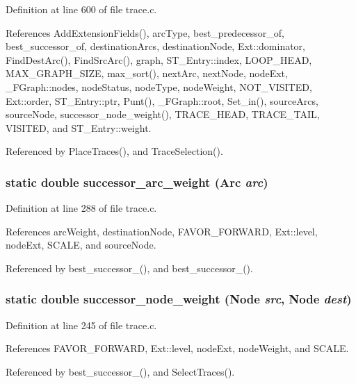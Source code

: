 Definition at line 600 of file trace.c.

References Add\-Extension\-Fields(), arc\-Type, best\_\-predecessor\_\-of, best\_\-successor\_\-of, destination\-Arcs, destination\-Node, Ext::dominator, Find\-Dest\-Arc(), Find\-Src\-Arc(), graph, ST\_\-Entry::index, LOOP\_\-HEAD, MAX\_\-GRAPH\_\-SIZE, max\_\-sort(), next\-Arc, next\-Node, node\-Ext, \_\-FGraph::nodes, node\-Status, node\-Type, node\-Weight, NOT\_\-VISITED, Ext::order, ST\_\-Entry::ptr, Punt(), \_\-FGraph::root, Set\_\-in(), source\-Arcs, source\-Node, successor\_\-node\_\-weight(), TRACE\_\-HEAD, TRACE\_\-TAIL, VISITED, and ST\_\-Entry::weight.

Referenced by Place\-Traces(), and Trace\-Selection().
\subsubsection{\setlength{\rightskip}{0pt plus 5cm}static double successor\_\-arc\_\-weight (\bf{Arc} {\em arc})\hspace{0.3cm}{\tt  [static]}}\label{trace_8c_b00c47a7608fdfec30e9a769b5955030}




Definition at line 288 of file trace.c.

References arc\-Weight, destination\-Node, FAVOR\_\-FORWARD, Ext::level, node\-Ext, SCALE, and source\-Node.

Referenced by best\_\-successor\_(), and best\_\-successor\_().
\subsubsection{\setlength{\rightskip}{0pt plus 5cm}static double successor\_\-node\_\-weight (\bf{Node} {\em src}, \bf{Node} {\em dest})\hspace{0.3cm}{\tt  [static]}}\label{trace_8c_a60d7e5ce632ed8682843883ab4c8bd7}




Definition at line 245 of file trace.c.

References FAVOR\_\-FORWARD, Ext::level, node\-Ext, node\-Weight, and SCALE.

Referenced by best\_\-successor\_(), and Select\-Traces().
